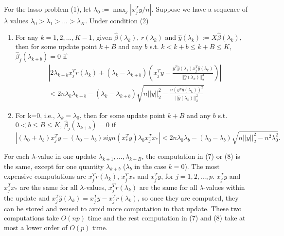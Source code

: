 \begin{theorem}
    For the lasso problem (1), let $\lambda_0:=\max_j|x_j^Ty/n|$. Suppose we have a sequence of $\lambda$ values $\lambda_0>\lambda_1>...>\lambda_K$. Under condition (2)
    \begin{enumerate}
        \item For any $k=1,2,...,K-1$, given $\hat{\beta}(\lambda_k)$, $r(\lambda_k)$ and $\hat{y}(\lambda_k):=X\hat{\beta}(\lambda_k)$, then for some update point $k+B$ and any $b$ s.t. $k<k+b\leq k+B\leq K$, $\hat{\beta}_j(\lambda_{k+b})=0$ if
        \begin{equation}
            \begin{split}
                &\left|2\lambda_{k+b}x_j^Tr(\lambda_k)+(\lambda_k-\lambda_{k+b})\left( x_j^Ty-\frac{y^T\hat{y}(\lambda_k)x_j^T\hat{y}(\lambda_k)}{||\hat{y}(\lambda_k)||_2^2}\right)\right|\\&<2n\lambda_k\lambda_{k+b}-(\lambda_k-\lambda_{k+b})\sqrt{n||y||_2^2-\frac{n(y^T\hat{y}(\lambda_k))^2}{||\hat{y}(\lambda_k)||_2^2}}
            \end{split}
        \end{equation}
        \item For k=0, i.e., $\lambda_k=\lambda_0$, then for some update point $k+B$ and any $b$ s.t. $0<b\leq B\leq K$, $\hat{\beta}_j(\lambda_{k+b})=0$ if
        \begin{equation}
        |(\lambda_0+\lambda_b)x_j^Ty-(\lambda_0-\lambda_b)sign(x_*^Ty)\lambda_0x_j^Tx_*|<2n\lambda_0\lambda_b-(\lambda_0-\lambda_b)\sqrt{n||y||_2^2-n^2\lambda_0^2}.
    \end{equation}
    \end{enumerate}
\end{theorem}

For each $\lambda$-value in one update $\lambda_{k+1},...,\lambda_{k+B}$, the computation in (7) or (8) is the same, except for one quantity $\lambda_{k+b}$ ($\lambda_b$ in the case $k=0$). The most expensive computations are $x_j^Tr(\lambda_k)$, $x_j^Tx_*$ and $x_j^Ty$, for $j=1,2,...,p$. $x_j^Ty$ and $x_j^Tx_*$ are the same for all $\lambda$-values, $x_j^Tr(\lambda_k)$ are the same for all $\lambda$-values within the update and $x_j^T\hat{y}(\lambda_k)=x_j^Ty-x_j^Tr(\lambda_k)$, so once they are computed, they can be stored and reused to avoid more computation in that update. These two computations take $O(np)$ time and the rest computation in (7) and (8) take at most a lower order of $O(p)$ time.

